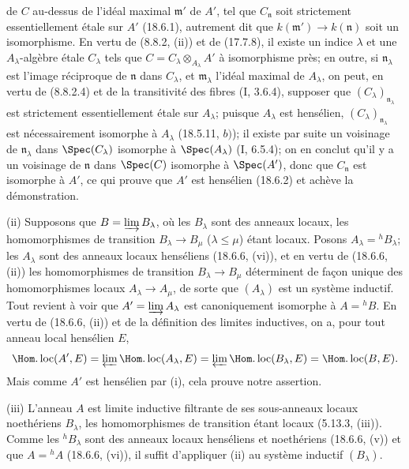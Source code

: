 
de $C$ au-dessus de l'idéal maximal $\mathfrak m'$ de $A'$, tel que $C_{\mathfrak n}$ soit strictement essentiellement étale sur $A'$ (18.6.1), autrement dit que $k(\mathfrak m')\to k(\mathfrak n)$ soit un isomorphisme. En vertu de (8.8.2, (ii)) et de (17.7.8), il existe un indice $\lambda$ et une $A_\lambda$-algèbre étale $C_\lambda$ tels que $C=C_\lambda\otimes_{A_\lambda}A'$ à isomorphisme près; en outre, si $\mathfrak n_\lambda$ est l'image réciproque de $\mathfrak n$ dans $C_\lambda$, et $\mathfrak m_\lambda$ l'idéal maximal de $A_\lambda$, on peut, en vertu de (8.8.2.4) et de la transitivité des fibres (I, 3.6.4), supposer que $(C_\lambda)_{\mathfrak n_\lambda}$ est strictement essentiellement étale sur $A_\lambda$; puisque $A_\lambda$ est hensélien, $(C_\lambda)_{\mathfrak n_\lambda}$ est nécessairement isomorphe à $A_\lambda$ (18.5.11, $b)$); il existe par suite un voisinage de $\mathfrak n_\lambda$ dans $\Spec(C_\lambda)$ isomorphe à $\Spec(A_\lambda)$ (I, 6.5.4); on en conclut qu'il y a un voisinage de $\mathfrak n$ dans $\Spec(C)$ isomorphe à $\Spec(A')$, donc que $C_{\mathfrak n}$ est isomorphe à $A'$, ce qui prouve que $A'$ est hensélien (18.6.2) et achève la démonstration.

(ii) Supposons que $B=\varinjlim B_\lambda$, où les $B_\lambda$ sont des anneaux locaux, les homomorphismes de transition $B_\lambda\to B_\mu$ ($\lambda\leq\mu$) étant locaux. Posons $A_\lambda={}^h\!B_\lambda$; les $A_\lambda$ sont des anneaux locaux henséliens (18.6.6, (vi)), et en vertu de (18.6.6, (ii)) les homomorphismes de transition $B_\lambda\to B_\mu$ déterminent de façon unique des homomorphismes locaux $A_\lambda\to A_\mu$, de sorte que $(A_\lambda)$ est un système inductif. Tout revient à voir que $A'=\varinjlim A_\lambda$ est canoniquement isomorphe à $A={}^h\!B$. En vertu de (18.6.6, (ii)) et de la définition des limites inductives, on a, pour tout anneau local hensélien $E$,
\[
  \Hom.\operatorname{loc}(A',E)
  =\varprojlim\Hom.\operatorname{loc}(A_\lambda,E)
  =\varprojlim\Hom.\operatorname{loc}(B_\lambda,E)
  =\Hom.\operatorname{loc}(B,E).
\]
Mais comme $A'$ est hensélien par (i), cela prouve notre assertion.

(iii) L'anneau $A$ est limite inductive filtrante de ses sous-anneaux locaux noethériens $B_\lambda$, les homomorphismes de transition étant locaux (5.13.3, (iii)). Comme les ${}^h\!B_\lambda$ sont des anneaux locaux henséliens et noethériens (18.6.6, (v)) et que $A={}^h\!A$ (18.6.6, (vi)), il suffit d'appliquer (ii) au système inductif $(B_\lambda)$.

